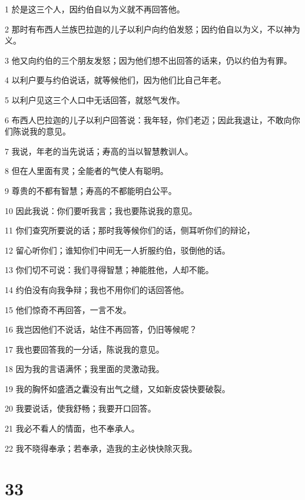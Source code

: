\par 1 於是这三个人，因约伯自以为义就不再回答他。
\par 2 那时有布西人兰族巴拉迦的儿子以利户向约伯发怒；因约伯自以为义，不以神为义。
\par 3 他又向约伯的三个朋友发怒；因为他们想不出回答的话来，仍以约伯为有罪。
\par 4 以利户要与约伯说话，就等候他们，因为他们比自己年老。
\par 5 以利户见这三个人口中无话回答，就怒气发作。
\par 6 布西人巴拉迦的儿子以利户回答说：我年轻，你们老迈；因此我退让，不敢向你们陈说我的意见。
\par 7 我说，年老的当先说话；寿高的当以智慧教训人。
\par 8 但在人里面有灵；全能者的气使人有聪明。
\par 9 尊贵的不都有智慧；寿高的不都能明白公平。
\par 10 因此我说：你们要听我言；我也要陈说我的意见。
\par 11 你们查究所要说的话；那时我等候你们的话，侧耳听你们的辩论，
\par 12 留心听你们；谁知你们中间无一人折服约伯，驳倒他的话。
\par 13 你们切不可说：我们寻得智慧；神能胜他，人却不能。
\par 14 约伯没有向我争辩；我也不用你们的话回答他。
\par 15 他们惊奇不再回答，一言不发。
\par 16 我岂因他们不说话，站住不再回答，仍旧等候呢？
\par 17 我也要回答我的一分话，陈说我的意见。
\par 18 因为我的言语满怀；我里面的灵激动我。
\par 19 我的胸怀如盛酒之囊没有出气之缝，又如新皮袋快要破裂。
\par 20 我要说话，使我舒畅；我要开口回答。
\par 21 我必不看人的情面，也不奉承人。
\par 22 我不晓得奉承；若奉承，造我的主必快快除灭我。

\chapter{33}

